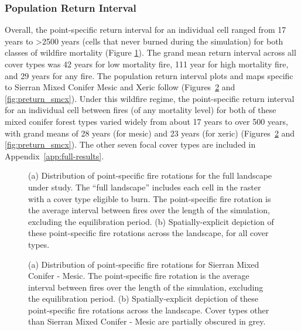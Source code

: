 \subsubsection{Population Return Interval}
Overall, the point-specific return interval for an individual cell ranged from 17 years to \textgreater 2500 years (cells that never burned during the simulation) for both classes of wildfire mortality (Figure \ref{fig:preturn}). The grand mean return interval across all cover types was 42 years for low mortality fire, 111 year for high mortality fire, and 29 years for any fire. The population return interval plots and maps specific to Sierran Mixed Conifer Mesic and Xeric follow (Figures~\ref{fig:preturn_smcm} and \ref{fig:preturn_smcx}). Under this wildfire regime, the point-specific return interval for an individual cell between fires (of any mortality level) for both of these mixed conifer forest types varied widely from about 17 years to over 500 years, with grand means of 28 years (for mesic) and 23 years (for xeric) (Figures~\ref{fig:preturn_smcm} and \ref{fig:preturn_smcx}). The other seven focal cover types are included in Appendix~\ref{app:full-results}. 




\begin{figure}[!htbp]
  \centering
  \qquad
  \caption{(a) Distribution of point-specific fire rotations for the full landscape under study. The ``full landscape'' includes each cell in the raster with a cover type eligible to burn. The point-specific fire rotation is the average interval between fires over the length of the simulation, excluding the equilibration period. (b) Spatially-explicit depiction of these point-specific fire rotations across the landscape, for all cover types.}
  \label{fig:preturn}
\end{figure}

\begin{figure}[!htbp]
  \centering
  \caption{(a) Distribution of point-specific fire rotations for Sierran Mixed Conifer - Mesic. The point-specific fire rotation is the average interval between fires over the length of the simulation, excluding the equilibration period. (b) Spatially-explicit depiction of these point-specific fire rotations across the landscape. Cover types other than Sierran Mixed Conifer - Mesic are partially obscured in grey.}
\label{fig:preturn_smcm}
\end{figure}

